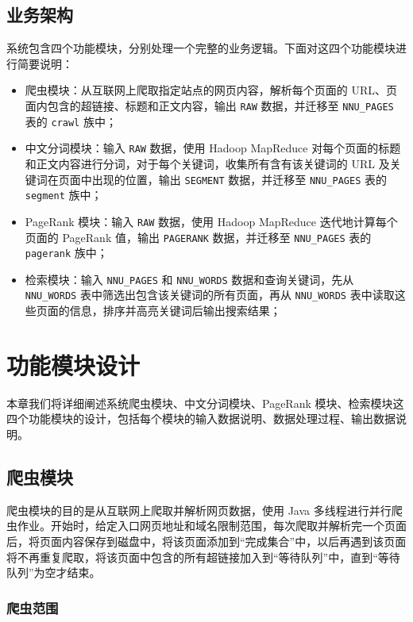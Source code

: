 \documentclass{ctexart}
\newcommand{\code}[1]{\colorbox{backcolor}{\lstinline|#1|}}
\begin{document}
    \subsection{业务架构}\label{subsec:archicture_modules}

    系统包含四个功能模块，分别处理一个完整的业务逻辑。下面对这四个功能模块进行简要说明：

    \begin{itemize}
        \item 爬虫模块：从互联网上爬取指定站点的网页内容，解析每个页面的 URL、页面内包含的超链接、标题和正文内容，输出 \code{RAW} 数据，并迁移至 \code{NNU_PAGES} 表的 \code{crawl} 族中；
        \item 中文分词模块：输入 \code{RAW} 数据，使用 Hadoop MapReduce 对每个页面的标题和正文内容进行分词，对于每个关键词，收集所有含有该关键词的 URL 及关键词在页面中出现的位置，输出 \code{SEGMENT} 数据，并迁移至 \code{NNU_PAGES} 表的 \code{segment} 族中；
        \item PageRank 模块：输入 \code{RAW} 数据，使用 Hadoop MapReduce 迭代地计算每个页面的 PageRank 值，输出 \code{PAGERANK} 数据，并迁移至 \code{NNU_PAGES} 表的 \code{pagerank} 族中；
        \item 检索模块：输入 \code{NNU_PAGES} 和 \code{NNU_WORDS} 数据和查询关键词，先从 \code{NNU_WORDS} 表中筛选出包含该关键词的所有页面，再从 \code{NNU_WORDS} 表中读取这些页面的信息，排序并高亮关键词后输出搜索结果；
    \end{itemize}


    \section{功能模块设计}\label{sec:modules}

    本章我们将详细阐述系统爬虫模块、中文分词模块、PageRank 模块、检索模块这四个功能模块的设计，包括每个模块的输入数据说明、数据处理过程、输出数据说明。

    \subsection{爬虫模块}\label{subsec:crawl}

    爬虫模块的目的是从互联网上爬取并解析网页数据，使用 Java 多线程进行并行爬虫作业。开始时，给定入口网页地址和域名限制范围，每次爬取并解析完一个页面后，将页面内容保存到磁盘中，将该页面添加到“完成集合”中，以后再遇到该页面将不再重复爬取，将该页面中包含的所有超链接加入到“等待队列”中，直到“等待队列”为空才结束。

    \subsubsection{爬虫范围}\label{subsubsec:crawl_scope}
\end{document}
